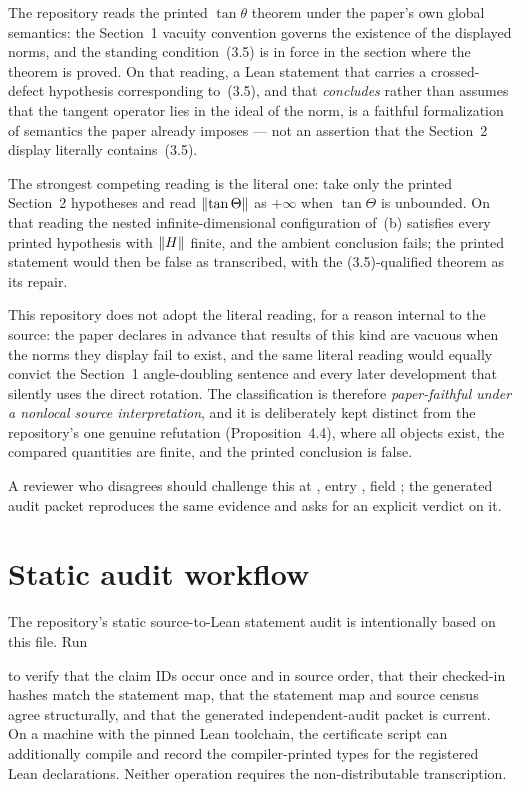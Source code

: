 The repository reads the printed $\tan\theta$ theorem under the paper's own global semantics: the Section~1 vacuity convention governs the existence of the displayed norms, and the standing condition~(3.5) is in force in the section where the theorem is proved.  On that reading, a Lean statement that carries a crossed-defect hypothesis corresponding to~(3.5), and that \emph{concludes} rather than assumes that the tangent operator lies in the ideal of the norm, is a faithful formalization of semantics the paper already imposes --- not an assertion that the Section~2 display literally contains~(3.5).

The strongest competing reading is the literal one: take only the printed Section~2 hypotheses and read $\left\lVert \tan\Theta\right\rVert$ as $+\infty$ when $\tan\Theta$ is unbounded.  On that reading the nested infinite-dimensional configuration of~(b) satisfies every printed hypothesis with $\left\lVert H\right\rVert$ finite, and the ambient conclusion fails; the printed statement would then be false as transcribed, with the (3.5)-qualified theorem as its repair.

This repository does not adopt the literal reading, for a reason internal to the source: the paper declares in advance that results of this kind are vacuous when the norms they display fail to exist, and the same literal reading would equally convict the Section~1 angle-doubling sentence and every later development that silently uses the direct rotation.  The classification is therefore \emph{paper-faithful under a nonlocal source interpretation}, and it is deliberately kept distinct from the repository's one genuine refutation (Proposition~4.4), where all objects exist, the compared quantities are finite, and the printed conclusion is false.

A reviewer who disagrees should challenge this at
, entry
, field ; the generated
audit packet reproduces the same evidence and asks for an explicit verdict on it.

\section*{Static audit workflow}
The repository's static source-to-Lean statement audit is intentionally based on this file.  Run
\begin{center}
\end{center}
to verify that the claim IDs occur once and in source order, that their checked-in hashes match the statement map, that the statement map and source census agree structurally, and that the generated independent-audit packet is current.  On a machine with the pinned Lean toolchain, the certificate script can additionally compile and record the compiler-printed types for the registered Lean declarations.  Neither operation requires the non-distributable transcription.


